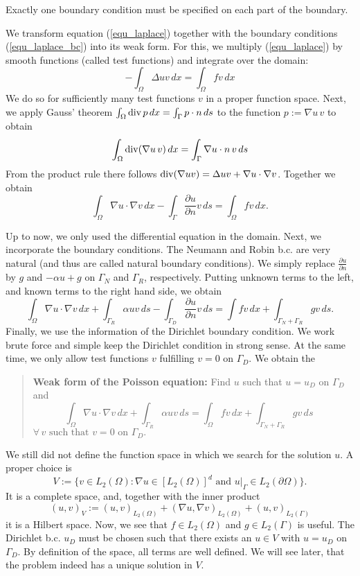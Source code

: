 Exactly one boundary condition must be specified on each part of the
boundary.

We transform equation (\ref{equ_laplace}) together with the boundary
conditions (\ref{equ_laplace_bc}) into its weak
form. For this, we multiply (\ref{equ_laplace}) by smooth functions 
(called test functions) and integrate over the domain:
\begin{equation}
\label{equ_multiplied}
- \int_\Omega \Delta u v \, dx  = \int_\Omega f v \, dx 
\end{equation}
We do so for sufficiently many test functions $v$ in a proper function space.
Next, we apply Gauss' theorem 
$
\int_\Omega \operatorname{div} p \, dx = \int_\Gamma p \cdot n \, ds
$ 
to the function $p := \nabla u \, v$ to obtain
$$
\int_\Omega \operatorname{div} (\nabla u \, v) \, dx = \int_\Gamma \nabla u \cdot n \, v \, ds
$$
From the product rule there follows $\operatorname{div} (\nabla u v) = \Delta u v + \nabla u \cdot \nabla v$. Together we obtain
$$
\int_\Omega \nabla u \cdot \nabla v \, dx - \int_\Gamma \frac{\partial u}{\partial n} v \, ds = \int_\Omega f v \, dx.
$$


Up to now, we only used the differential equation in the domain. Next, we
incorporate the boundary conditions. The Neumann and Robin b.c. are very
natural (and thus are called natural boundary conditions). We simply replace
$\frac{\partial u}{\partial n}$ by $g$ and $-\alpha u + g$ on $\Gamma_N$ and
$\Gamma_R$, respectively. Putting unknown terms to the left, and known terms
to the right hand side, we obtain
$$
\int_\Omega \nabla u \cdot \nabla v \, dx + \int_{\Gamma_R} \alpha u v \, ds 
-\int_{\Gamma_D} \frac{\partial u}{\partial n} v \, ds = 
\int f v \, dx + \int_{\Gamma_N+\Gamma_R} g v \, ds.
$$
Finally, we use the information of the Dirichlet boundary condition. We
work brute force and simple keep the Dirichlet condition in strong sense.
At the same time, we only allow test functions $v$ fulfilling $v = 0$
on $\Gamma_D$. We obtain the 
\begin{quote}
{\bf Weak form of the Poisson equation:} \newline
Find $u$ such that $u = u_D$ on $\Gamma_D$ and
\begin{equation}
\label{equ_weak_form}
\int_\Omega \nabla u \cdot \nabla v \, dx + \int_{\Gamma_R} \alpha u v \, ds = 
\int_\Omega f v \, dx + \int_{\Gamma_N+\Gamma_R} g v \, ds \quad
\end{equation}
\hfill $\forall \, v \mbox{ such that } v = 0 \mbox{ on } \Gamma_D.$
\end{quote}
%
We still did not define the function space in which we search for the
solution $u$. A proper choice is $$ V := \{ v \in L_2(\Omega) : \nabla
u \in [L_2(\Omega)]^d \mbox{ and } u|_\Gamma \in L_2(\partial \Omega)
\}.  $$ It is a complete space, and, together with the inner product
$$ (u,v)_V := (u,v)_{L_2(\Omega)} + (\nabla u, \nabla v)_{L_2(\Omega)}
+ (u, v)_{L_2(\Gamma)} $$ it is a Hilbert space.  Now, we see that $f
\in L_2(\Omega)$ and $g \in L_2(\Gamma)$ is useful. The Dirichlet
b.c. $u_D$ must be chosen such that there exists an $u \in V$ with $u
= u_D$ on $\Gamma_D$.  By definition of the space, all terms are well
defined. We will see later, that the problem indeed has a unique
solution in $V$. 


